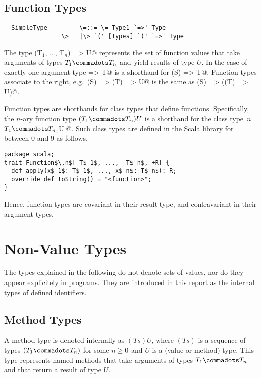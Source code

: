 \documentclass[11pt]{report}
\begin{document}
\subsection{Function Types}
\label{sec:function-types}

\syntax\begin{verbatim}
  SimpleType         \=::= \= Type1 `=>' Type
                \>   |\> `(' [Types] `)' `=>' Type
\end{verbatim}
The type \verb@(T$_1$, ..., T$_n$) => U@ represents the set of function
values that take arguments of types $T_1 \commadots T_n$ and yield
results of type $U$.  In the case of exactly one argument type
\verb@S => T@ is a shorthand for \verb@(S) => T@.  Function types
associate to the right, e.g.\ \verb@(S) => (T) => U@ is the same as
\verb@(S) => ((T) => U)@.

Function types are shorthands for class types that define \verb@apply@
functions.  Specifically, the $n$-ary function type $(T_1 \commadots
T_n)U$ is a shorthand for the class type
\verb@Function$\,n$[$T_1 \commadots T_n$,U]@. Such class
types are defined in the Scala library for \verb@n@ between 0 and 9 as follows.
\begin{verbatim}
package scala;
trait Function$\,n$[-T$_1$, ..., -T$_n$, +R] {
  def apply(x$_1$: T$_1$, ..., x$_n$: T$_n$): R;
  override def toString() = "<function>";
}
\end{verbatim}
Hence, function types are covariant in their result type, and
contravariant in their argument types.

\section{Non-Value Types}
\label{sec:synthetic-types}

The types explained in the following do not denote sets of values, nor
do they appear explicitely in programs. They are introduced in this
report as the internal types of defined identifiers.

\subsection{Method Types}
\label{sec:method-types}

A method type is denoted internally as $(Ts)U$, where $(Ts)$ is a
sequence of types $(T_1 \commadots T_n)$ for some $n \geq 0$
and $U$ is a (value or method) type.  This type represents named
methods that take arguments of types $T_1 \commadots T_n$ 
and that return a result of type $U$.
\end{document}
